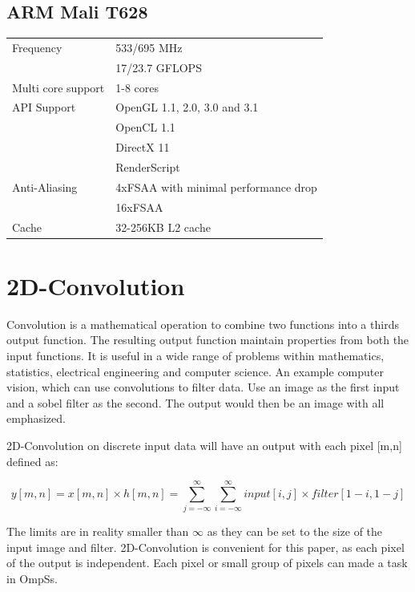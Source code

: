 \subsection{ARM Mali T628}
\begin{table}[H]
  \begin{tabular}{ll}
    Frequency         & 533/695 MHz \\
                      & 17/23.7 GFLOPS \\
    Multi core support & 1-8 cores  \\
    API Support       & OpenGL 1.1, 2.0, 3.0 and 3.1  \\
                      & OpenCL 1.1  \\
                      & DirectX 11  \\
                      & RenderScript \\
    Anti-Aliasing     & 4xFSAA with minimal performance drop  \\
                      & 16xFSAA  \\
    Cache             & 32-256KB L2 cache
  \end{tabular}
\end{table}

\section{2D-Convolution}
Convolution is a mathematical operation to combine two functions into a thirds output function.
The resulting output function maintain properties from both the input functions.
It is useful in a wide range of problems within mathematics, statistics, electrical engineering and computer science.
An example computer vision, which can use convolutions to filter data.
Use an image as the first input and a sobel filter as the second.
The output would then be an image with all emphasized.

2D-Convolution on discrete input data will have an output with each pixel [m,n] defined as:

\begin{equation} \label{eq:2dconvolutionpixel}
  y[m,n] = x[m,n] \times h[m,n] = \sum\limits_{j=-\infty}^\infty \sum\limits_{i=-\infty}^\infty input[i,j] \times filter[1-i, 1-j]
\end{equation}

The limits are in reality smaller than $\infty$ as they can be set to the size of the input image and filter.
2D-Convolution is convenient for this paper, as each pixel of the output is independent.
Each pixel or small group of pixels can made a task in OmpSs.

